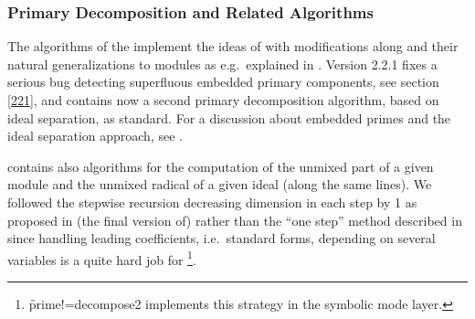 \subsubsection{Primary Decomposition and Related Algorithms}

The algorithms of the  implement the ideas of
\cite{Gianni:88} with modifications along \cite{Kredel:87} and their natural
generalizations to modules as e.g.\ explained in \cite{Rutman:92}. Version
2.2.1 fixes a serious bug detecting superfluous embedded primary
components, see section \ref{221}, and contains now a second primary
decomposition algorithm, based on ideal separation, as standard. For a
discussion about embedded primes and the ideal separation approach,
see \cite{Graebe:97}.


 contains also algorithms for the computation of the unmixed part
of a given module and the unmixed radical of a given ideal (along the
same lines). We followed the stepwise recursion decreasing dimension
in each step by 1 as proposed in (the final version of) \cite{Gianni:88}
rather than the ``one step'' method described in \cite{Becker:93} since
handling leading coefficients, i.e.\ standard forms, depending on
several variables is a quite hard job for
\REDUCE\footnote{\f{prime!=decompose2}
implements this strategy in the symbolic mode layer.}.

